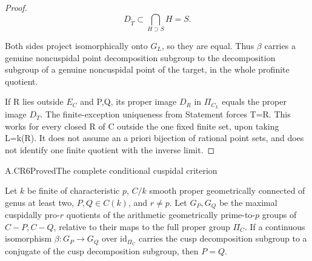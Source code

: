 \begin{proof}
\[
D_{\widetilde T}\subset\bigcap_{H\supset S}H=S.
\]

Both sides project isomorphically onto \(G_L\), so they are equal. Thus \({\beta}\) carries a genuine noncuspidal point decomposition subgroup to the decomposition subgroup of a genuine noncuspidal point of the target, in the whole profinite quotient.

If R lies outside \(E_C\) and P,Q, its proper image \(D_R\) in \({\Pi}_{C_L}\) equals the proper image \(D_T\). The finite-exception uniqueness from Statement  forces T=R. This works for every closed R of C outside the one fixed finite set, upon taking L=k(R). It does not assume an a priori bijection of rational point sets, and does not identify one finite quotient with the inverse limit.


\end{proof}

\begin{claim}{A.CR6}{Proved}{The complete conditional cuspidal criterion}

Let $k$ be finite of characteristic $p$, $C/k$ smooth proper
geometrically connected of genus at least two, $P,Q\in C(k)$, and
$r\ne p$. Let $G_P,G_Q$ be the maximal cuspidally pro-$r$ quotients
of the arithmetic geometrically prime-to-$p$ groups of $C-P,C-Q$,
relative to their maps to the full proper group $\Pi_C$. If a
continuous isomorphism $\beta:G_P\to G_Q$ over
$\mathrm{id}_{\Pi_C}$ carries the cusp decomposition subgroup to
a conjugate of the cusp decomposition subgroup, then $P=Q$.

\end{claim}


